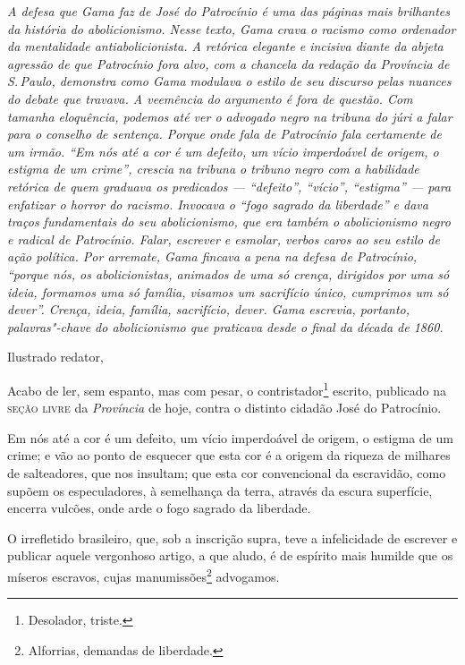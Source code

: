 \begin{flushleft}
{\footnotesize\itshape
A defesa que Gama faz de José do Patrocínio é uma das páginas mais
brilhantes da história do abolicionismo. Nesse texto, Gama crava o
racismo como ordenador da mentalidade antiabolicionista. A retórica
elegante e incisiva diante da abjeta agressão de que Patrocínio fora
alvo, com a chancela da redação da Província de S.\,Paulo, demonstra como
Gama modulava o estilo de seu discurso pelas nuances do debate que
travava. A veemência do argumento é fora de questão. Com tamanha
eloquência, podemos até ver o advogado negro na tribuna do júri a
falar para o conselho de sentença. Porque onde fala de Patrocínio fala
certamente de um irmão. ``Em nós até a cor é um defeito, um vício
imperdoável de origem, o estigma de um crime'', crescia na tribuna o
tribuno negro com a habilidade retórica de quem graduava os predicados
--- ``defeito'', ``vício'', ``estigma'' --- para enfatizar o horror do racismo.
Invocava o ``fogo sagrado da liberdade'' e dava traços fundamentais do seu
abolicionismo, que era também o abolicionismo negro e radical de Patrocínio.
Falar, escrever e esmolar, verbos caros ao seu estilo de ação política.
Por arremate, Gama fincava a pena na defesa de Patrocínio, ``porque nós,
os abolicionistas, animados de uma só crença, dirigidos por uma só
ideia, formamos uma só família, visamos um sacrifício único, cumprimos
um só dever''. Crença, ideia, família, sacrifício, dever. Gama escrevia,
portanto, palavras"-chave do abolicionismo que praticava desde o final da
década de 1860. }
\end{flushleft}\pagebreak


\noindent{}Ilustrado redator,

Acabo de ler, sem espanto, mas com pesar, o contristador\footnote{
  Desolador, triste.} escrito, publicado na \textsc{seção livre} da
\emph{Província} de hoje, contra o distinto cidadão José do Patrocínio.

Em nós até a cor é um defeito, um vício imperdoável de origem, o estigma
de um crime; e vão ao ponto de esquecer que esta cor é a origem da
riqueza de milhares de salteadores, que nos insultam; que esta cor
convencional da escravidão, como supõem os especuladores, à semelhança
da terra, através da escura superfície, encerra vulcões, onde arde o
fogo sagrado da liberdade.

O irrefletido brasileiro, que, sob a inscrição supra, teve a
infelicidade de escrever e publicar aquele vergonhoso artigo, a que
aludo, é de espírito mais humilde que os míseros escravos, cujas
manumissões\footnote{Alforrias, demandas de liberdade.} advogamos.

